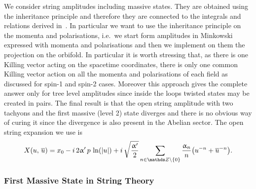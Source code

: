We consider string amplitudes including massive states.
They are obtained using the inheritance principle and therefore they are connected to the integrals and relations derived in~.
In particular we want to use the inheritance principle on the momenta and polarisations, i.e.\ we start form amplitudes in Minkowski expressed with momenta and polarisations and then we implement on them the projection on the orbifold.
In particular it is worth stressing that, as there is one Killing vector acting on the spacetime coordinates, there is only one common Killing vector action on all the momenta and polarisations of each field as discussed for spin-1 and spin-2 cases.
Moreover this approach gives the complete answer only for tree level amplitudes since inside the loops twisted states may be created in pairs.
The final result is that the open string amplitude with two tachyons and the first massive (level 2) state diverges and there is no obvious way of curing it since the divergence is also present in the Abelian sector.
The open string expansion we use is
\begin{equation}
  X\qty(u,\, \baru)
  =
  x_0
  -
  i\, 2\ap\, p\, \ln(\abs{u})
  +
  i\, \sqrt{\frac{\ap}{2}}
  \sum_{n \in \Z \setminus \qty{0}} \frac{\alpha_n}{n}
  \qty( u^{-n} + \baru^{-n} ).
\end{equation}


\subsubsection{First Massive State in String Theory}

